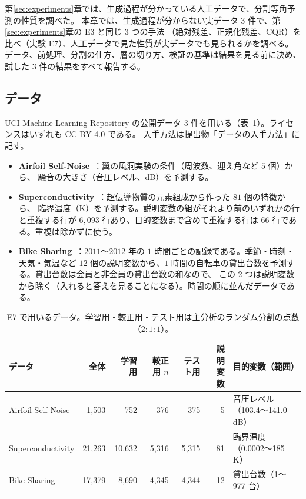 \documentclass[a4paper,11pt]{jsarticle}
\theoremstyle{definition}
\theoremstyle{plain}
\theoremstyle{remark}
\begin{document}
第\ref{sec:experiments}章では、生成過程が分かっている人工データで、分割等角予測の性質を調べた。
本章では、生成過程が分からない実データ $3$ 件で、第\ref{sec:experiments}章の E3 と同じ $3$ つの手法
（絶対残差、正規化残差、CQR）を比べ（実験 E7）、人工データで見た性質が実データでも見られるかを調べる。
データ、前処理、分割の仕方、層の切り方、検証の基準は結果を見る前に決め、試した $3$ 件の結果をすべて報告する。

\subsection{データ}
\label{sec:real-data-data}
UCI Machine Learning Repository の公開データ $3$ 件を用いる（表~\ref{tab:e7-data}）。ライセンスはいずれも CC BY 4.0 である。
入手方法は提出物「データの入手方法」に記す。
\begin{itemize}
  \item \textbf{Airfoil Self-Noise}~\cite{brooks1989airfoil}：翼の風洞実験の条件（周波数、迎え角など $5$ 個）から、
    騒音の大きさ（音圧レベル、dB）を予測する。
  \item \textbf{Superconductivity}~\cite{hamidieh2018superconductivity}：超伝導物質の元素組成から作った $81$ 個の特徴から、
    臨界温度（K）を予測する。説明変数の組がそれより前のいずれかの行と重複する行が $6{,}093$ 行あり、目的変数まで含めて重複する行は $66$ 行である。重複は除かずに使う。
  \item \textbf{Bike Sharing}~\cite{fanaee2013bike}：$2011$〜$2012$ 年の $1$ 時間ごとの記録である。季節・時刻・天気・気温など
    $12$ 個の説明変数から、$1$ 時間の自転車の貸出台数を予測する。貸出台数は会員と非会員の貸出台数の和なので、
    この $2$ つは説明変数から除く（入れると答えを見ることになる）。時間の順に並んだデータである。
\end{itemize}

\begin{table}[htbp]
  \centering
  \caption{E7 で用いるデータ。学習用・較正用・テスト用は主分析のランダム分割の点数（$2:1:1$）。}
  \label{tab:e7-data}
  \small
  \setlength{\tabcolsep}{4pt}%
  \begin{tabular}{lrrrrrl}
    \toprule
    データ & 全体 & 学習用 & 較正用 $n$ & テスト用 & 説明変数 & 目的変数（範囲） \\
    \midrule
    Airfoil Self-Noise & 1,503 & 752 & 376 & 375 & 5 & 音圧レベル（103.4〜141.0 dB） \\
    Superconductivity & 21,263 & 10,632 & 5,316 & 5,315 & 81 & 臨界温度（0.0002〜185 K） \\
    Bike Sharing & 17,379 & 8,690 & 4,345 & 4,344 & 12 & 貸出台数（1〜977 台） \\
    \bottomrule
  \end{tabular}
\end{table}
\end{document}

